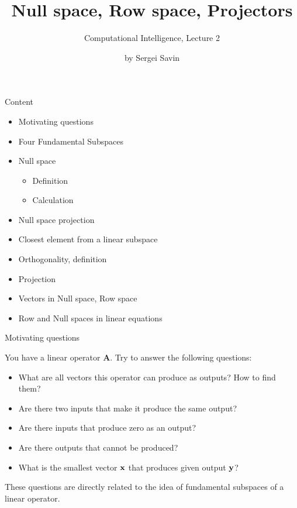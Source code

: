 \documentclass{beamer}
\title{Null space, Row space, Projectors}
\subtitle{Computational Intelligence, Lecture 2}
\author{by Sergei Savin}
\date{\mydate}
\begin{document}
\maketitle


\begin{frame}{Content}

\begin{itemize}
\item Motivating questions
\item Four Fundamental Subspaces
\item Null space
\begin{itemize}
    \item Definition
    \item Calculation
\end{itemize}
\item Null space projection
\item Closest element from a linear subspace
\item Orthogonality, definition
\item Projection
\item Vectors in Null space, Row space
\item Row and Null spaces in linear equations
\end{itemize}

\end{frame}




\begin{frame}{Motivating questions}
\begin{flushleft}

You have a linear operator $\mathbf A$. Try to answer the following questions:

\begin{itemize}
    \item What are all vectors this operator can produce as outputs? How to find them?
    \item Are there two inputs that make it produce the same output?
    \item Are there inputs that produce zero as an output?
    \item Are there outputs that cannot be produced? 
    \item What is the smallest vector $\mathbf{x}$ that produces given output $\mathbf{y}$? 
\end{itemize}

These questions are directly related to the idea of fundamental subspaces of a linear operator.

\end{flushleft}
\end{frame}
\end{document}
